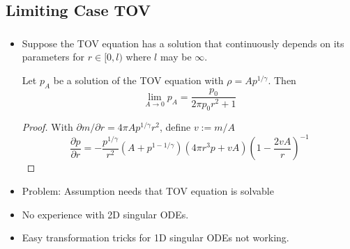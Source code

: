 \subsection{Limiting Case TOV}
\begin{frame}[allowframebreaks]
	\frametitle{\insertsubsection}
	\begin{itemize}[<+->]
		\item Suppose the TOV equation has a solution that continuously depends on its parameters for $r\in[0,l)$ where $l$ may be $\infty$.
		\begin{theorem}
			Let $p_A$ be a solution of the TOV equation with $\rho=Ap^{1/\gamma}$. Then 
			\begin{equation}
				\lim_{A\rightarrow0}p_A=\frac{p_0}{2\pi p_0r^2+1}
			\end{equation}
		\end{theorem}
		\begin{proof}
			With $\partial m/\partial r = 4\pi Ap^{1/\gamma}r^2$, define $v:=m/A$
			\begin{equation}
				\frac{\partial p}{\partial r} = -\frac{p^{1/\gamma}}{r^2}\left(A+p^{1-1/\gamma}\right)\left(4\pi r^3p+vA\right)\left(1-\frac{2vA}{r}\right)^{-1}
			\end{equation}
		\end{proof}
	\end{itemize}
\end{frame}

\begin{frame}
	\begin{itemize}[<+->]
		\begin{proof}
			Then for $A=0$, we have
			\begin{equation}
				\frac{\partial p}{\partial r} = -4\pi rp^2
			\end{equation}
			The solution to this differential equation is $p=\frac{p_0}{2\pi p_0r^2+1}$.
		\end{proof}
		\item Problem: Assumption needs that TOV equation is solvable
		\item No experience with 2D singular ODEs.
		\item Easy transformation tricks for 1D singular ODEs not working.
	\end{itemize}
\end{frame}


